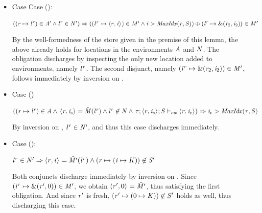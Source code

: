 \begin{bproof}
\begin{bcase}[\dregparletlocafternewreg{}]
\begin{enumerate}
\begin{itemize}
\begin{itemize}

\item Case Case ():

$ ((\mathit{r} \mapsto {\mathit{l}}^{\mathit{r}}) \in \mathit{A}' \wedge {\mathit{l}}^{\mathit{r}} \in \mathit{N}') \Rightarrow \\
          (({\mathit{l}}^{\mathit{r}} \mapsto \langle \mathit{r}, \mathit{i} \rangle ^{}) \in \mathit{M}' \wedge
          \mathit{i} > \mathit{MaxIdx}(\mathit{r},\mathit{S}))
          \oplus
          ({\mathit{l}}^{\mathit{r}} \mapsto \text{\&}(\mathit{r}_2,\mathit{i}_2)) \in \mathit{M}'
          $

By the well-formedness of the store given in the premise of this lemma,
the above already holds for locations in the environments $\mathit{A}$ and $\mathit{N}$.
%
The obligation discharges by inspecting the only new location
added to environments, namely ${\mathit{l}}^{\mathit{r}}$.
%
The second disjunct, namely
$({\mathit{l}}^{\mathit{r}} \mapsto \text{\&}(\mathit{r}_2,\mathit{i}_2)) \in \mathit{M}'$,
follows immediately by inversion on \dregparletlocafternewreg{}.

\item Case ()

$ ((\mathit{r} \mapsto {\mathit{l}}^{\mathit{r}}) \in \mathit{A} \wedge 
    \, \langle \mathit{r}, \mathit{i}_s \rangle ^{} = \hat{\mathit{M}}({\mathit{l}}^{\mathit{r}}) \wedge
    {\mathit{l}}^{\mathit{r}} \not \in \mathit{N} \wedge
    \, \mathit{\tau};\langle \mathit{r}, \mathit{i}_s \rangle ^{};\mathit{S} \vdash_{\textit{ew}} \langle \mathit{r}, \mathit{i}_e \rangle ^{}) \Rightarrow
          \mathit{i}_e > \mathit{MaxIdx}(\mathit{r},\mathit{S})
          $

By inversion on \tllafter{}, ${\mathit{l}}^{\mathit{r}} \in \mathit{N}'$, and thus this
case discharges immediately.

\item Case ():

$ {\mathit{l}}^{\mathit{r}} \in \mathit{N}' \Rightarrow
          \langle \mathit{r}, \mathit{i} \rangle ^{} = \hat{\mathit{M}'}({\mathit{l}}^{\mathit{r}}) \wedge
          (\mathit{r} \mapsto (\mathit{i} \mapsto \mathit{K})) \not \in \mathit{S}'
          $

Both conjuncts discharge immediately by inversion on \dregparletlocafternewreg{}.
%
Since $({\mathit{l}}^{\mathit{r}} \mapsto \text{\&}(\mathit{r}',0)) \in \mathit{M}'$,
we obtain $\langle \mathit{r}', 0 \rangle ^{} = \hat{\mathit{M}'}$, thus satisfying the first obligation.
%
And since $\mathit{r}'$ is fresh, $(\mathit{r}' \mapsto (0 \mapsto \mathit{K})) \not \in \mathit{S}'$
holds as well, thus discharging this case.


\end{itemize}
\end{itemize}
\end{enumerate}
\end{bcase}
\end{bproof}
